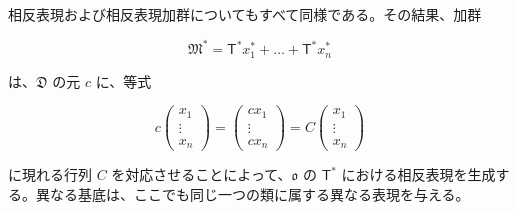 相反表現および相反表現加群についてもすべて同様である。その結果、加群

\[\mathfrak{M}^* = \mathsf{T}^* x_1^* + \dots + \mathsf{T}^* x_n^*\]

は、$\mathfrak D$ の元 $c$ に、等式

\[
c\begin{pmatrix}x_1\\ \vdots\\ x_n\end{pmatrix}
=\begin{pmatrix}cx_1\\ \vdots\\ cx_n\end{pmatrix}
=C\begin{pmatrix}x_1\\ \vdots\\ x_n\end{pmatrix}
\]

に現れる行列 $C$ を対応させることによって、$\mathfrak{o}$ の $\mathsf T^*$ における相反表現を生成する。異なる基底は、ここでも同じ一つの類に属する異なる表現を与える。
